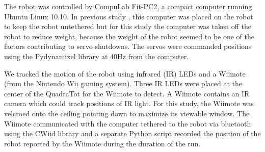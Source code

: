 The robot was controlled by CompuLab Fit-PC2, a compact computer running Ubuntu Linux 10.10. 
In previous study \cite{yos:clune}, this computer was placed on the robot to keep the robot untethered but for this study the computer was taken off the robot to reduce weight, because the weight of the robot seemed to be one of the factors contributing to servo shutdowns. 
The servos were commanded positions using the Pydynamixel library at 40Hz from the computer. 


We tracked the motion of the robot using infrared (IR) LEDs and a Wiimote (from the Nintendo Wii gaming system).
Three IR LEDs were placed at the center of the QuadraTot for the Wiimote to detect. 
A Wiimote contains an IR camera which could track positions of IR light. 
For this study, the Wiimote was velcroed onto the ceiling pointing down to maximize its viewable window. 
The Wiimote communicated with the computer tethered to the robot via bluetooth using the CWiid library and a separate Python script recorded the position of the robot reported by the Wiimote during the duration of the run. 




